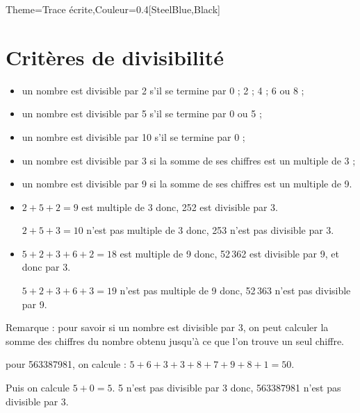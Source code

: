 \begin{Maquette}[Cours]{Theme={Trace écrite},Couleur={0.4[SteelBlue,Black]}}
   \section{Critères de divisibilité}
   
   \begin{propriete*}{}
      \begin{itemize}
         \item un nombre est divisible par 2 s'il se termine par 0 ; 2 ; 4 ; 6 ou 8 ;
         \item un nombre est divisible par 5 s'il se termine par 0 ou 5 ;
         \item un nombre est divisible par 10 s'il se termine par 0 ;
         \item un nombre est divisible par 3 si la somme de ses chiffres est un multiple de 3 ;
         \item un nombre est divisible par 9 si la somme de ses chiffres est un multiple de 9.
      \end{itemize}
   \end{propriete*}
   
   \begin{exemple*}{}   
      \begin{itemize}
         \item $2+5+2=9$ est multiple de 3 donc, 252 est divisible par 3. \par
            $2+5+3=10$ n'est pas multiple de 3 donc, 253 n'est pas divisible par 3.
         \item $5+2+3+6+2=18$ est multiple de 9 donc, 52\,362 est divisible par 9, et donc par 3. \par
            $5+2+3+6+3=19$ n'est pas multiple de 9 donc, 52\,363 n'est pas divisible par 9.
         \end{itemize}
   \end{exemple*}
   
   Remarque : pour savoir si un nombre est divisible par 3, on peut calculer la somme des chiffres du nombre obtenu jusqu'à ce que l'on trouve un seul chiffre. \par
      pour \num{563387981}, on calcule : $5+6+3+3+8+7+9+8+1=50$. \par
      Puis on calcule $5+0=5$. 5 n'est pas divisible par 3 donc, \num{563387981} n'est pas divisible par 3.

\end{Maquette}


